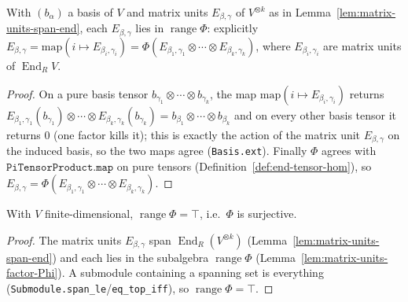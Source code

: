 \begin{lemma}
    \label{lem:matrix-units-factor-Phi}
    With $(b_\alpha)$ a basis of $V$ and matrix units $E_{\beta,\gamma}$ of $V^{\otimes k}$ as in
    Lemma~\ref{lem:matrix-units-span-end}, each $E_{\beta,\gamma}$ lies in $\operatorname{range}\Phi$:
    explicitly $E_{\beta,\gamma} = \mathrm{map}(i \mapsto E_{\beta_i,\gamma_i}) =
    \Phi(E_{\beta_1,\gamma_1} \otimes \cdots \otimes E_{\beta_k,\gamma_k})$, where $E_{\beta_i,\gamma_i}$ are
    matrix units of $\operatorname{End}_R V$.
\end{lemma}
\begin{proof}
    On a pure basis tensor $b_{\gamma_1} \otimes \cdots \otimes b_{\gamma_k}$, the map
    $\mathrm{map}(i \mapsto E_{\beta_i,\gamma_i})$ returns $E_{\beta_1,\gamma_1}(b_{\gamma_1}) \otimes \cdots
    \otimes E_{\beta_k,\gamma_k}(b_{\gamma_k}) = b_{\beta_1} \otimes \cdots \otimes b_{\beta_k}$ and on every
    other basis tensor it returns $0$ (one factor kills it); this is exactly the action of the matrix unit
    $E_{\beta,\gamma}$ on the induced basis, so the two maps agree (\texttt{Basis.ext}). Finally $\Phi$
    agrees with $\texttt{PiTensorProduct.map}$ on pure tensors (Definition~\ref{def:end-tensor-hom}), so
    $E_{\beta,\gamma} = \Phi(E_{\beta_1,\gamma_1} \otimes \cdots \otimes E_{\beta_k,\gamma_k})$.
\end{proof}

\begin{lemma}
    \label{lem:matrix-units-in-range-Phi}
    With $V$ finite-dimensional, $\operatorname{range}\Phi = \top$, i.e.\ $\Phi$ is surjective.
\end{lemma}
\begin{proof}
    The matrix units $E_{\beta,\gamma}$ span $\operatorname{End}_R(V^{\otimes k})$
    (Lemma~\ref{lem:matrix-units-span-end}) and each lies in the subalgebra $\operatorname{range}\Phi$
    (Lemma~\ref{lem:matrix-units-factor-Phi}). A submodule containing a spanning set is everything
    (\texttt{Submodule.span\_le}/\texttt{eq\_top\_iff}), so $\operatorname{range}\Phi = \top$.
\end{proof}


